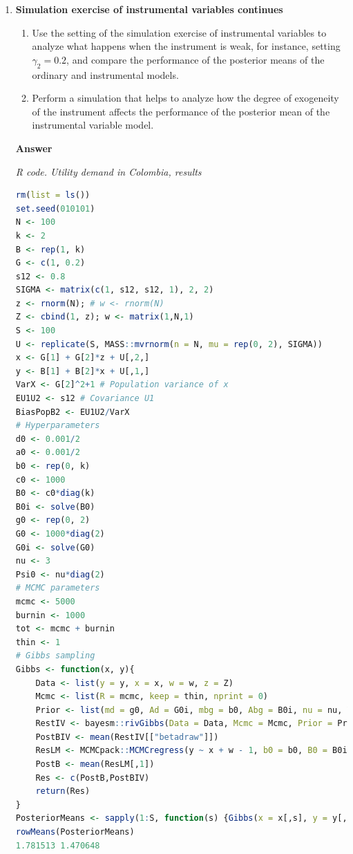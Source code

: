 \begin{enumerate}[leftmargin=*]
\item \textbf{Simulation exercise of instrumental variables continues}

\begin{enumerate}
	\item Use the setting of the simulation exercise of instrumental variables to analyze what happens when the instrument is weak, for instance, setting $\gamma_2=0.2$, and compare the performance of the posterior means of the ordinary and instrumental models.
	\item Perform a simulation that helps to analyze how the degree of exogeneity of the instrument affects the performance of the posterior mean of the instrumental variable model.	 
\end{enumerate}

\textbf{Answer}

\begin{tcolorbox}[enhanced,width=4.67in,center upper,
	fontupper=\large\bfseries,drop shadow southwest,sharp corners]
	\textit{R code. Utility demand in Colombia, results}
	\begin{VF}
		\begin{lstlisting}[language=R]
rm(list = ls())
set.seed(010101)
N <- 100
k <- 2
B <- rep(1, k)
G <- c(1, 0.2)
s12 <- 0.8
SIGMA <- matrix(c(1, s12, s12, 1), 2, 2)
z <- rnorm(N); # w <- rnorm(N)
Z <- cbind(1, z); w <- matrix(1,N,1)
S <- 100
U <- replicate(S, MASS::mvrnorm(n = N, mu = rep(0, 2), SIGMA))
x <- G[1] + G[2]*z + U[,2,]
y <- B[1] + B[2]*x + U[,1,]
VarX <- G[2]^2+1 # Population variance of x
EU1U2 <- s12 # Covariance U1
BiasPopB2 <- EU1U2/VarX
# Hyperparameters
d0 <- 0.001/2
a0 <- 0.001/2
b0 <- rep(0, k)
c0 <- 1000
B0 <- c0*diag(k)
B0i <- solve(B0)
g0 <- rep(0, 2)
G0 <- 1000*diag(2)
G0i <- solve(G0)
nu <- 3
Psi0 <- nu*diag(2)
# MCMC parameters
mcmc <- 5000
burnin <- 1000
tot <- mcmc + burnin
thin <- 1
# Gibbs sampling
Gibbs <- function(x, y){
	Data <- list(y = y, x = x, w = w, z = Z)
	Mcmc <- list(R = mcmc, keep = thin, nprint = 0)
	Prior <- list(md = g0, Ad = G0i, mbg = b0, Abg = B0i, nu = nu, V = Psi0)
	RestIV <- bayesm::rivGibbs(Data = Data, Mcmc = Mcmc, Prior = Prior)
	PostBIV <- mean(RestIV[["betadraw"]])
	ResLM <- MCMCpack::MCMCregress(y ~ x + w - 1, b0 = b0, B0 = B0i, c0 = a0, d0 = d0)
	PostB <- mean(ResLM[,1])
	Res <- c(PostB,PostBIV)
	return(Res)
}
PosteriorMeans <- sapply(1:S, function(s) {Gibbs(x = x[,s], y = y[,s])})
rowMeans(PosteriorMeans)
1.781513 1.470648
\end{lstlisting}
	\end{VF}
\end{tcolorbox} 


\end{enumerate}
